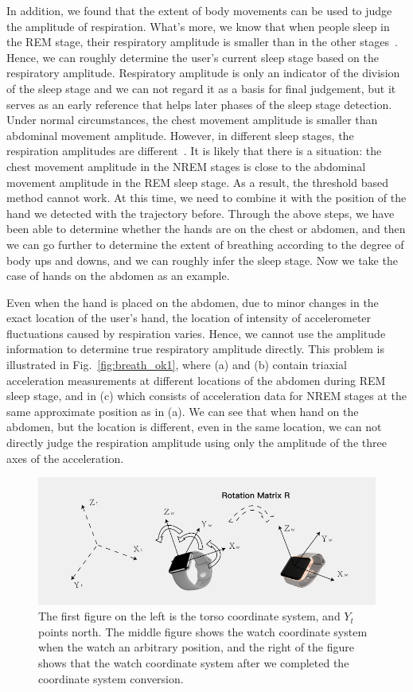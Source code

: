 In addition, we found that the extent of body movements can be used to judge the amplitude of respiration. What's more, we know that when people sleep in the REM stage, their respiratory amplitude is smaller than in the other stages~\cite{respiratory1982}. Hence, we can roughly determine the user's current sleep stage based on the respiratory amplitude. Respiratory amplitude is only an indicator of the division of the sleep stage and we can not regard it as a basis for final judgement, but it serves as an early reference that helps later phases of the sleep stage detection. Under normal circumstances, the chest movement amplitude is smaller than abdominal movement amplitude. However, in different sleep stages, the respiration amplitudes are different~\cite{respiratory}. It is likely that there is a situation: the chest movement amplitude in the NREM stages is close to the abdominal movement amplitude in the REM sleep stage. As a result, the threshold based method cannot work. At this time, we need to combine it with the position of the hand we detected with the trajectory before. Through the above steps, we have been able to determine whether the hands are on the chest or abdomen, and then we can go further to determine the extent of breathing according to the degree of body ups and downs, and we can roughly infer the sleep stage. Now we take the case of hands on the abdomen as an example.



Even when the hand is placed on the abdomen, due to minor changes in the exact location of the user's hand, the location of intensity of accelerometer fluctuations caused by respiration varies. Hence, we cannot use the amplitude information to determine true respiratory amplitude directly. This problem is illustrated in Fig.~\ref{fig:breath_ok1}, where (a) and (b) contain triaxial acceleration measurements at different locations of the abdomen during REM sleep stage, and in (c) which consists of acceleration data for NREM stages at the same approximate position as in (a). We can see that when hand on the abdomen, but the location is different, even in the same location, we can not directly judge the respiration amplitude using only the amplitude of the three axes of the acceleration.

\begin{figure}[!t]
\centering
      \includegraphics[width=0.67\linewidth]{Figures/watch.pdf}
  \caption{The first figure on the left is the torso coordinate system, and $Y_t$ points north. The middle figure shows the watch coordinate system when the watch an arbitrary position, and the right of the figure shows that the  watch coordinate system after we completed the coordinate system conversion.}\label{fig:watch}
\end{figure}

